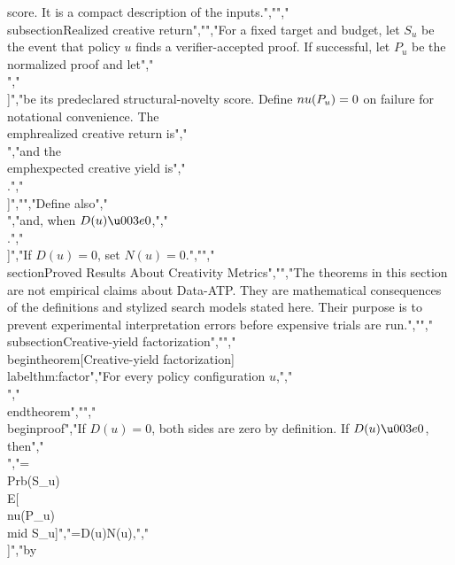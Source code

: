 {{{score. It is a compact description of the inputs.","","\\subsection{Realized creative return}","","For a fixed target and budget, let $S_u$ be the event that policy $u$ finds a verifier-accepted proof. If successful, let $P_u$ be the normalized proof and let","\\[","\\nu(P_u)\\in[0,1]","\\]","be its predeclared structural-novelty score. Define $\\nu(P_u)=0$ on failure for notational convenience. The \\emph{realized creative return} is","\\[","Z_u=\\ind_{S_u}\\,\\nu(P_u),","\\]","and the \\emph{expected creative yield} is","\\[","\\cY(u)=\\E[Z_u].","\\]","","Define also","\\[","D(u)=\\Prb(S_u)","\\]","and, when $D(u)\u003e0$,","\\[","N(u)=\\E[\\nu(P_u)\\mid S_u].","\\]","If $D(u)=0$, set $N(u)=0$.","","\\section{Proved Results About Creativity Metrics}","","The theorems in this section are not empirical claims about Data-ATP. They are mathematical consequences of the definitions and stylized search models stated here. Their purpose is to prevent experimental interpretation errors before expensive trials are run.","","\\subsection{Creative-yield factorization}","","\\begin{theorem}[Creative-yield factorization]\\label{thm:factor}","For every policy configuration $u$,","\\[","\\cY(u)=D(u)N(u).","\\]","\\end{theorem}","","\\begin{proof}","If $D(u)=0$, both sides are zero by definition. If $D(u)\u003e0$, then","\\[","\\cY(u)","=\\E[\\ind_{S_u}\\nu(P_u)]","=\\Prb(S_u)\\E[\\nu(P_u)\\mid S_u]","=D(u)N(u),","\\]","by }}}
